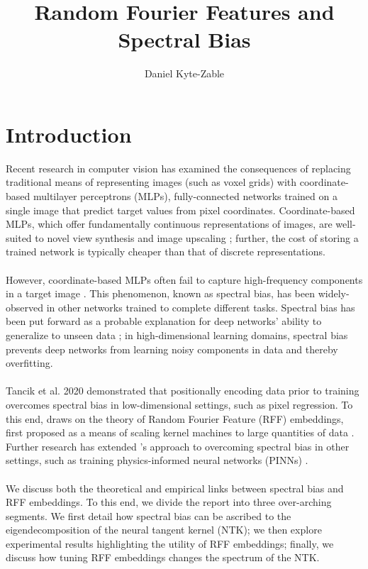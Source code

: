 \documentclass[11pt]{article}
\title{\textbf{\sffamily Random Fourier Features and Spectral Bias}}
\author{Daniel Kyte-Zable}
\date{}
\begin{document}
\newtheorem*{btheorem*}{Bochner's Theorem}
\newtheorem*{lemma*}{Eigenfunctions of $T_{\Theta \circ k_\text{RBF}}$}

\maketitle
\thispagestyle{fancy}


\section{Introduction}
Recent research in computer vision has examined the consequences of replacing traditional means of representing images (such as voxel grids) with coordinate-based multilayer perceptrons (MLPs), fully-connected networks trained on a single image that predict target values from pixel coordinates. Coordinate-based MLPs, which offer fundamentally continuous representations of images, are well-suited to novel view synthesis \cite{NeRF} and image upscaling \cite{CMLPs}; further, the cost of storing a trained network is typically cheaper than that of discrete representations.\\
\\
However, coordinate-based MLPs often fail to capture high-frequency components in a target image \cite{Tancik20, PINN}. This phenomenon, known as spectral bias, has been widely-observed in other networks trained to complete different tasks. Spectral bias has been put forward as a probable explanation for deep networks' ability to generalize to unseen data \cite{generalize}; in high-dimensional learning domains, spectral bias prevents deep networks from learning noisy components in data and thereby overfitting.\\
\\
Tancik et al. 2020 \cite{Tancik20} demonstrated that positionally encoding data prior to training overcomes spectral bias in low-dimensional settings, such as pixel regression. To this end, \cite{Tancik20} draws on the theory of Random Fourier Feature (RFF) embeddings, first proposed as a means of scaling kernel machines to large quantities of data \cite{RFF}. Further research has extended \cite{Tancik20}'s approach to overcoming spectral bias in other settings, such as training physics-informed neural networks (PINNs) \cite{PINN}.\\
\\
We discuss both the theoretical and empirical links between spectral bias and RFF embeddings. To this end, we divide the report into three over-arching segments. We first detail how spectral bias can be ascribed to the eigendecomposition of the neural tangent kernel (NTK); we then explore experimental results highlighting the utility of RFF embeddings; finally, we discuss how tuning RFF embeddings changes the spectrum of the NTK.
\end{document}
